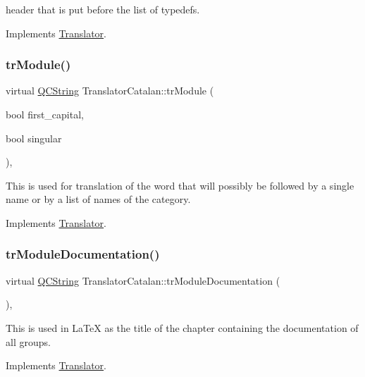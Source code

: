 header that is put before the list of typedefs. 

Implements \mbox{\hyperlink{class_translator}{Translator}}.

\mbox{\label{class_translator_catalan_aa7917b53eb558afead346792fcd3f071}} 
\subsubsection{\texorpdfstring{trModule()}{trModule()}}
{\footnotesize\ttfamily virtual \mbox{\hyperlink{class_q_c_string}{Q\+C\+String}} Translator\+Catalan\+::tr\+Module (\begin{DoxyParamCaption}\item[{bool}]{first\+\_\+capital,  }\item[{bool}]{singular }\end{DoxyParamCaption})\hspace{0.3cm}{\ttfamily [inline]}, {\ttfamily [virtual]}}

This is used for translation of the word that will possibly be followed by a single name or by a list of names of the category. 

Implements \mbox{\hyperlink{class_translator}{Translator}}.

\mbox{\label{class_translator_catalan_a42e68d09039fc3cd371c5685bf0e6635}} 
\subsubsection{\texorpdfstring{trModuleDocumentation()}{trModuleDocumentation()}}
{\footnotesize\ttfamily virtual \mbox{\hyperlink{class_q_c_string}{Q\+C\+String}} Translator\+Catalan\+::tr\+Module\+Documentation (\begin{DoxyParamCaption}{ }\end{DoxyParamCaption})\hspace{0.3cm}{\ttfamily [inline]}, {\ttfamily [virtual]}}

This is used in La\+TeX as the title of the chapter containing the documentation of all groups. 

Implements \mbox{\hyperlink{class_translator}{Translator}}.

